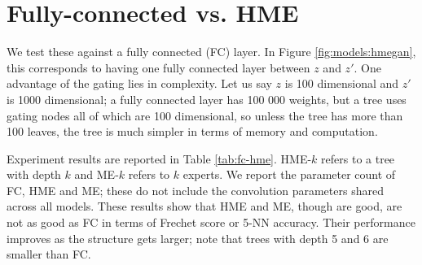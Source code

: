 \documentclass[a4paper,onesided,12pt]{report}
\begin{document}
\section{Fully-connected vs. HME}
\label{sec:fc-vs-hme}
We test these against a fully connected (FC) layer. In Figure \ref{fig:models:hmegan}, this corresponds to having one fully connected layer between $z$ and $z'$. One advantage of the gating lies in complexity. Let us say $z$ is 100 dimensional and $z'$ is 1000 dimensional; a fully connected layer has 100 000 weights, but a tree uses gating nodes all of which are 100 dimensional, so unless the tree has more than 100 leaves, the tree is much simpler in terms of memory and computation.

Experiment results are reported in Table \ref{tab:fc-hme}. HME-$k$ refers to a tree with depth $k$ and ME-$k$ refers to $k$ experts. We report the parameter count of FC, HME and ME; these do not include the convolution parameters shared across all models. These results show that HME and ME, though are good, are not as good as FC in terms of Frechet score or 5-NN accuracy. Their performance improves as the structure gets larger; note that trees with depth 5 and 6 are smaller than FC.
\end{document}
